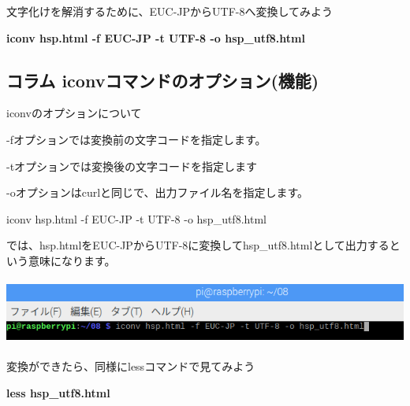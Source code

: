 \documentclass[a4paper,12pt,dvipdfmx]{jarticle}
\begin{document}
\bigskip


\bigskip

\clearpage
文字化けを解消するために、EUC-JPからUTF-8へ変換してみよう

\textbf{iconv hsp.html -f EUC-JP -t UTF-8 -o hsp\_utf8.html}

\begin{center}
\begin{boxedminipage}{17.228cm}
\section*{コラム
iconvコマンドのオプション(機能)}
iconvのオプションについて

{}-fオプションでは変換前の文字コードを指定します。

{}-tオプションでは変換後の文字コードを指定します

{}-oオプションはcurlと同じで、出力ファイル名を指定します。

iconv hsp.html -f EUC-JP -t UTF-8 -o hsp\_utf8.html

では、hsp.htmlをEUC-JPからUTF-8に変換してhsp\_utf8.htmlとして出力するという意味になります。
\end{boxedminipage}
\end{center}
\begin{center}
\includegraphics[width=17.006cm,height=2.164cm]{textbook-img022.png}

\end{center}
変換ができたら、同様にlessコマンドで見てみよう

\textbf{less hsp\_utf8.html}
\end{document}
